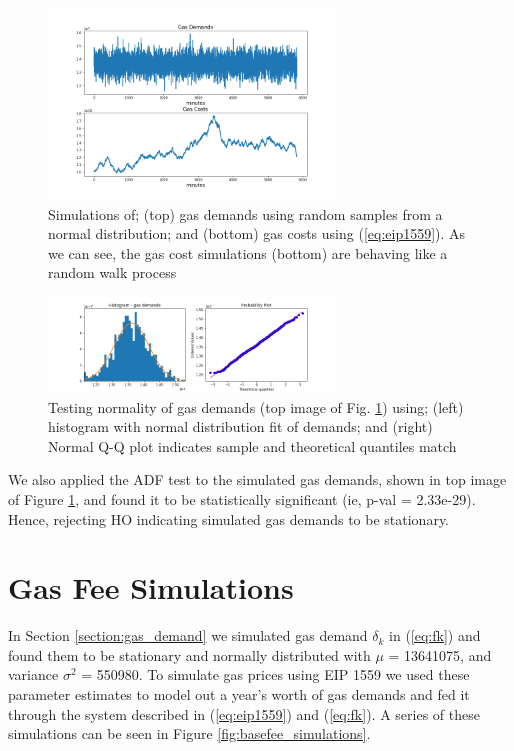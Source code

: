 \documentclass[peerreview]{ieeesyscoin}
\begin{document}
\begin{figure}[h!]
\includegraphics[width=3in]{img/gas.png}
\caption{Simulations of; (top) gas demands using random samples from a normal distribution; and (bottom) gas costs using (\ref{eq:eip1559}). As we can see, the gas cost simulations (bottom) are behaving like a random walk process} 
\label{fig:gas}
\end{figure} 

\begin{figure}[h!]
\includegraphics[width=3in]{img/gaussian_analysis.png}
\caption{Testing normality of gas demands (top image of Fig. \ref{fig:gas}) using; (left) histogram with normal distribution fit of demands; and (right) Normal Q-Q plot indicates sample and theoretical quantiles match} 
\label{fig:eda}
\end{figure} 

We also applied the ADF test to the simulated gas demands, shown in top image of Figure \ref{fig:gas}, and found it to be statistically significant (ie, p-val = 2.33e-29). Hence, rejecting HO indicating simulated gas demands to be stationary. 

\section{Gas Fee Simulations}
\label{section:gas_fees}

In Section \ref{section:gas_demand} we simulated gas demand  $\delta_{k}$ in (\ref{eq:fk}) and found them to be stationary and normally distributed with $\mu$ = 13641075, and variance $\sigma^2$ = 550980. To simulate gas prices using EIP 1559 we used these parameter estimates to model out a year's worth of gas demands and fed it through the system described in (\ref{eq:eip1559}) and (\ref{eq:fk}). A series of these simulations can be seen in Figure \ref{fig:basefee_simulations}.
\end{document}
